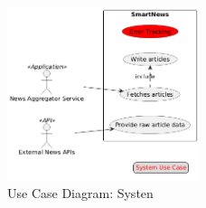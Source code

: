 \begin{figure}[!h]
    \centering
    \includegraphics[width=0.5\textwidth]{chapters/chapter_02/use-case-smart-news-system}
    \caption{Use Case Diagram: Systen}
    \label{fig:use-case-diagram-system}
\end{figure}



